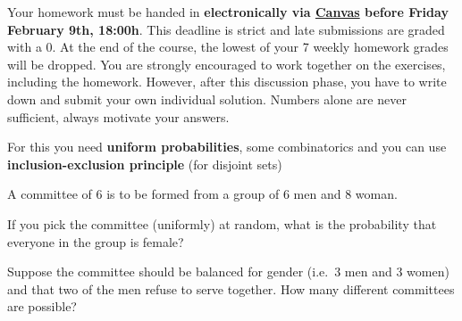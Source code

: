 \documentclass[a4paper,10pt,landscape,twocolumn]{scrartcl}
\newcommand\deadline{Friday February 9th, 18:00h}
\begin{document}
\homeworkproblems

{\sffamily\noindent
Your homework must be handed in \textbf{electronically via \href{\canvasURL}{Canvas} before \deadline}. 
This deadline is strict and late submissions are graded with a 0. At the end of the course, the lowest of your 7 weekly homework grades will be dropped. You are strongly encouraged to work together on the exercises, including the homework. However, after this discussion phase, you have to write down and submit your own individual solution. Numbers alone are never sufficient, always motivate your answers.
}

	
\begin{exercise}[Committees (3pt)]
	\begin{mycomment}
		For this you need \textbf{uniform probabilities}, some combinatorics and you can use \textbf{inclusion-exclusion principle} (for disjoint sets)
	\end{mycomment}

	A committee of 6 is to be formed from a group of 6 men and 8 woman.

	\begin{subex}[1pt]
	If you pick the committee (uniformly) at random, what is the probability that everyone in the group is female?
	\end{subex}

	\begin{subex}[2pt]
		Suppose the committee should be balanced for gender
                (i.e.\ 3 men and 3 women) and that two of the men refuse to serve together. How many different committees are possible?
	\end{subex}
\end{exercise}
\end{document}
